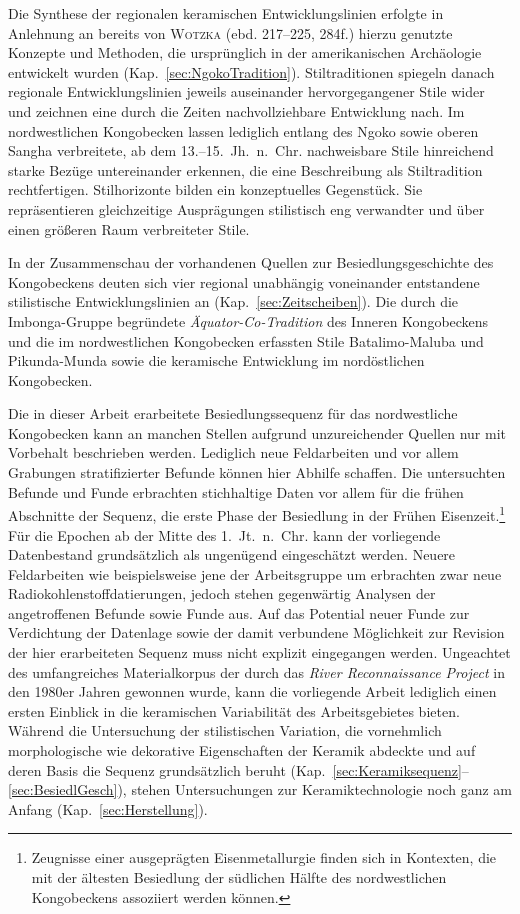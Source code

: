Die Synthese der regionalen keramischen Entwicklungslinien erfolgte in Anlehnung an bereits von \textsc{Wotzka} (ebd. 217--225, 284f.) hierzu genutzte Konzepte und Methoden, die ursprünglich in der amerikanischen Archäologie entwickelt wurden (Kap.~\ref{sec:NgokoTradition}). Stiltraditionen spiegeln danach regionale Entwicklungslinien jeweils auseinander hervorgegangener Stile wider und zeichnen eine durch die Zeiten nachvollziehbare Entwicklung nach. Im nordwestlichen Kongobecken lassen lediglich entlang des Ngoko sowie oberen Sangha verbreitete, ab dem 13.--15.~Jh.~n.~Chr. nachweisbare Stile hinreichend starke Bezüge untereinander erkennen, die eine Beschreibung als Stiltradition rechtfertigen. Stilhorizonte bilden ein konzeptuelles Gegenstück. Sie repräsentieren gleichzeitige Ausprägungen stilistisch eng verwandter und über einen größeren Raum verbreiteter Stile. 

In der Zusammenschau der vorhandenen Quellen zur Besiedlungsgeschichte des Kongobeckens deuten sich vier regional unabhängig voneinander entstandene stilistische Entwicklungslinien an (Kap.~\ref{sec:Zeitscheiben}). Die durch die Imbonga-Gruppe begründete \textit{Äquator-Co-Tradition} des Inneren Kongobeckens und die im nordwestlichen Kongobecken erfassten Stile Batalimo-Maluba und Pikunda-Munda sowie die keramische Entwicklung im nordöstlichen Kongobecken. 

Die in dieser Arbeit erarbeitete Besiedlungssequenz für das nordwestliche Kongobecken kann an manchen Stellen aufgrund unzureichender Quellen nur mit Vorbehalt beschrieben werden. Lediglich neue Feldarbeiten und vor allem Grabungen stratifizierter Befunde können hier Abhilfe schaffen. Die untersuchten Befunde und Funde erbrachten stichhaltige Daten vor allem für die frühen Abschnitte der Sequenz, die erste Phase der Besiedlung in der Frühen \linebreak\clearpage\noindent Eisenzeit.\footnote{Zeugnisse einer ausgeprägten Eisenmetallurgie finden sich in Kontexten, die mit der ältesten Besiedlung der südlichen Hälfte des nordwestlichen Kongobeckens assoziiert werden können.} Für die Epochen ab der Mitte des 1.~Jt.~n.~Chr. kann der vorliegende Datenbestand grundsätzlich als ungenügend eingeschätzt werden. Neuere Feldarbeiten wie beispielsweise jene der Arbeitsgruppe um \textcites{Oslisly.2013b}{MorinRivat.2014} erbrachten zwar neue Radiokohlenstoffdatierungen, jedoch stehen gegenwärtig Analysen der angetroffenen Befunde sowie Funde aus. Auf das Potential neuer Funde zur Verdichtung der Datenlage sowie der damit verbundene Möglichkeit zur Revision der hier erarbeiteten Sequenz muss nicht explizit eingegangen werden. Ungeachtet des umfangreiches Materialkorpus der durch das \textit{River Reconnaissance Project} in den 1980er Jahren gewonnen wurde, kann die vorliegende Arbeit lediglich einen ersten Einblick in die keramischen Variabilität des Arbeitsgebietes bieten. Während die Untersuchung der stilistischen Variation, die vornehmlich morphologische wie dekorative Eigenschaften der Keramik abdeckte und auf deren Basis die Sequenz grundsätzlich beruht (Kap.~\ref{sec:Keramiksequenz}--\ref{sec:BesiedlGesch}), stehen Untersuchungen zur Keramiktechnologie noch ganz am Anfang (Kap.~\ref{sec:Herstellung}).

